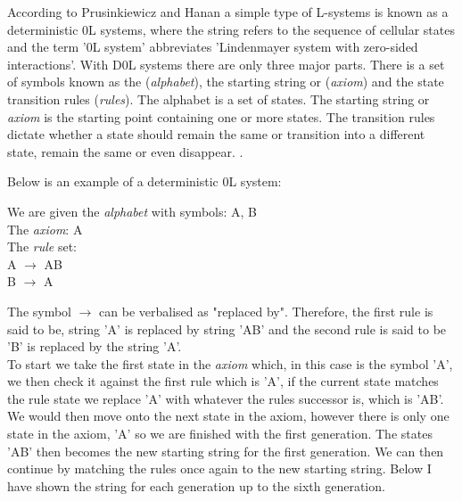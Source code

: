 \begin{flushleft}

According to Prusinkiewicz and Hanan a simple type of L-systems is known as a deterministic 0L systems, where the string refers to the sequence of cellular states and the term '0L system' abbreviates 'Lindenmayer system with zero-sided interactions'.  With D0L systems there are only three major parts. There is a set of symbols known as the (\textit{alphabet}), the starting string or (\textit{axiom}) and the state transition rules (\textit{rules}). The alphabet is a set of states. The starting string or \textit{axiom} is the starting point containing one or more states. The transition rules dictate whether a state should remain the same or transition into a different state, remain the same or even disappear. \cite{prusinkiewicz2013lindenmayer}. \\

\vspace{5mm}

Below is an example of a deterministic 0L system: \\

\vspace{5mm}

We are given the \textit{alphabet} with symbols: A, B \\ 
The \textit{axiom}: A \\
The \textit{rule} set: \\ 
A $\rightarrow$ AB \\
B $\rightarrow$ A \\

\vspace{5mm}

The symbol $\rightarrow$ can be verbalised as "replaced by". Therefore, the first rule is said to be, string 'A' is replaced by string 'AB' and the second rule is said to be 'B' is replaced by the string 'A'.\\
To start we take the first state in the \textit{axiom} which, in this case is the symbol 'A', we then check it against the first rule which is 'A', if the current state matches the rule state we replace 'A' with whatever the rules successor is, which is 'AB'. We would then move onto the next state in the axiom, however there is only one state in the axiom, 'A' so we are finished with the first generation. The states 'AB' then becomes the new starting string for the first generation. We can then continue by matching the rules once again to the new starting string. Below I have shown the string for each generation up to the sixth generation.\\


\end{flushleft}
